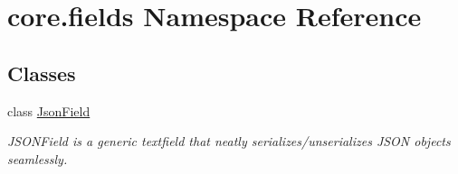 \hypertarget{namespacecore_1_1fields}{\section{core.\-fields Namespace Reference}
\label{namespacecore_1_1fields}
}
\subsection*{Classes}
\begin{DoxyCompactItemize}
\item 
class \hyperlink{classcore_1_1fields_1_1JsonField}{Json\-Field}
\begin{DoxyCompactList}\small\item\em J\-S\-O\-N\-Field is a generic textfield that neatly serializes/unserializes J\-S\-O\-N objects seamlessly. \end{DoxyCompactList}\end{DoxyCompactItemize}
